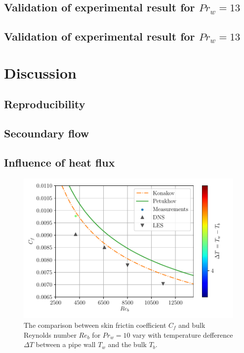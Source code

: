 \documentclass[12pt,oneside]{jbook}
\begin{document}
\subsection{Validation of experimental result for $Pr_{w}=13$}
\subsection{Validation of experimental result for $Pr_{w}=13$}

\section{Discussion}
\subsection{Reproducibility}
\subsection{Secoundary flow}
\subsection{Influence of heat flux}
\begin{figure}[ht]
	\vspace{0zh}
	\begin{center}
		\includegraphics[width=1\linewidth]{fig/pr10heatflux_recfdt.pdf}
		\vspace{-3zh}
		\caption{The comparison between skin frictin coefficient $C_{f}$ and bulk Reynolds number $Re_{b}$ for $Pr_{w} = 10$ vary with temperature defference $\Delta T$ between a pipe wall $T_{w}$ and the bulk $T_{b}$.}
		\label{}
	\end{center}
	\vspace{0zh}
\end{figure}
\end{document}
